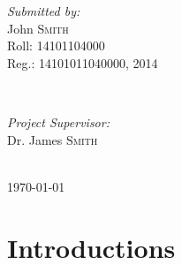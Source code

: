 \documentclass[hidelinks,14pt]{extarticle}
\begin{document}
\begin{titlepage}

\begin{minipage}{0.4\textwidth}
\begin{flushleft} \large
\emph{Submitted by:}\\
John \textsc{Smith} \\%
Roll: 14101104000 \\ %
Reg.: 14101011040000, 2014 %
\end{flushleft}
\end{minipage}
~
\begin{minipage}{0.4\textwidth}
\begin{flushright} \large
\emph{Project Supervisor:} \\
Dr. James \textsc{Smith}\\ %
\end{flushright}
\end{minipage}\\[1cm]




{\normalsize \today}\\ %


\vfill %

\end{titlepage}

\begin{abstract}
The abstract is a succinct, single-paragraph summary of your paper’s purpose, main points, method, findings, and conclusions, and is often recommended to be written after the rest of your report has been completed. The abstract\'s length should be minimum of 150 words and maximum of 250 words and should be confined within a paragraph. Use the active voice and past tense in the abstract, but present tense may be used to describe conclusion and implications.
\end{abstract}
\clearpage

\tableofcontents
\pagebreak

\section{Introductions}
\end{document}
